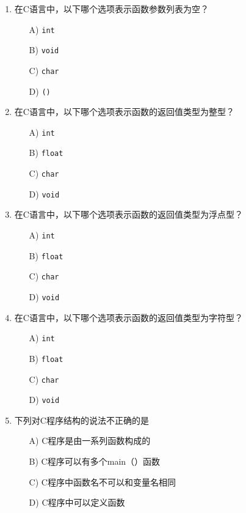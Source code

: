 \documentclass[a4paper,12pt]{article}
\begin{document}
\begin{enumerate}
	\item 在C语言中，以下哪个选项表示函数参数列表为空？
	      \begin{enumerate}
		      \item[A)] \texttt{int}
		      \item[B)] \texttt{void}
		      \item[C)] \texttt{char}
		      \item[D)] \texttt{()}
	      \end{enumerate}
	      \vspace{0.3cm}

	\item 在C语言中，以下哪个选项表示函数的返回值类型为整型？
	      \begin{enumerate}
		      \item[A)] \texttt{int}
		      \item[B)] \texttt{float}
		      \item[C)] \texttt{char}
		      \item[D)] \texttt{void}
	      \end{enumerate}
	      \vspace{0.3cm}

	\item 在C语言中，以下哪个选项表示函数的返回值类型为浮点型？
	      \begin{enumerate}
		      \item[A)] \texttt{int}
		      \item[B)] \texttt{float}
		      \item[C)] \texttt{char}
		      \item[D)] \texttt{void}
	      \end{enumerate}
	      \vspace{0.3cm}

	\item 在C语言中，以下哪个选项表示函数的返回值类型为字符型？
	      \begin{enumerate}
		      \item[A)] \texttt{int}
		      \item[B)] \texttt{float}
		      \item[C)] \texttt{char}
		      \item[D)] \texttt{void}
	      \end{enumerate}
	      \vspace{0.3cm}

	\item 下列对C程序结构的说法不正确的是
	      \begin{enumerate}
		      \item[A)] C程序是由一系列函数构成的
		      \item[B)] C程序可以有多个main（）函数
		      \item[C)] C程序中函数名不可以和变量名相同
		      \item[D)] C程序中可以定义函数
	      \end{enumerate}
	      \vspace{0.3cm}


\end{enumerate}
\end{document}
